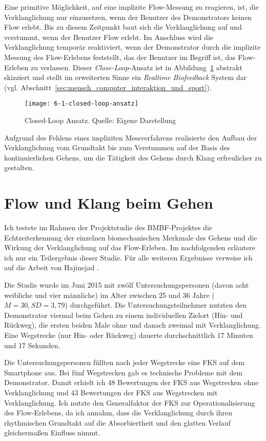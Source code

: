 Eine primitive Möglichkeit, auf eine implizite Flow-Messung zu reagieren, ist, die Verklanglichung nur einzusetzen, wenn der Benutzer des Demonstrators keinen Flow erlebt. Bis zu diesem Zeitpunkt baut sich die Verklanglichung auf und verstummt, wenn der Benutzer Flow erlebt. Im Anschluss wird die Verklanglichung temporär reaktiviert, wenn der Demonstrator durch die implizite Messung des Flow-Erlebens feststellt, das der Benutzer im Begriff ist, das Flow-Erleben zu verlassen. Dieser \emph{Close-Loop}-Ansatz ist in Abbildung~\ref{fig:6_1_closed_loop_ansatz} abstrakt skizziert \citep[vgl.][S.~474]{Calvo2015} und stellt im erweiterten Sinne ein \emph{Realtime Biofeedback} System dar (vgl. Abschnitt~\ref{sec:mensch_computer_interaktion_und_sport}). 

\begin{figure}[!htb]
	\centering
		\texttt{[image: 6-1-closed-loop-ansatz]}
	\caption[Closed-Loop Ansatz]{Closed-Loop Ansatz. Quelle: Eigene Darstellung}
	\label{fig:6_1_closed_loop_ansatz}
\end{figure}

Aufgrund des Fehlens eines impliziten Messverfahrens realisierte \citet{Hajinejad} den Aufbau der Verklanglichung vom Grundtakt bis zum Verstummen auf der Basis des kontinuierlichen Gehens, um die Tätigkeit des Gehens durch Klang erfreulicher zu gestalten.

\section{Flow und Klang beim Gehen}
Ich testete im Rahmen der Projektstudie des \acs{BMBF}-Projektes die Echtzeiterkennung der einzelnen biomechanischen Merkmale des Gehens und die Wirkung der Verklanglichung auf das Flow-Erleben. Im nachfolgenden erläutere ich nur ein Teilergebnis dieser Studie. Für alle weiteren Ergebnisse verweise ich auf die Arbeit von Hajinejad \citet{Hajinejad}. 

Die Studie wurde im Juni 2015 mit zwölf Untersuchungspersonen (davon acht weibliche und vier männliche) im Alter zwischen 25 und 36 Jahre ($M = 30, SD = 3,79$) durchgeführt. Die Untersuchungsteilnehmer nutzten den Demonstrator viermal beim Gehen zu einem individuellen Zielort (Hin- und Rückweg), die ersten beiden Male ohne und danach zweimal mit Verklanglichung. Eine Wegstrecke (nur Hin- oder Rückweg) dauerte durchschnittlich 17 Minuten und 17 Sekunden. 

Die Untersuchungspersonen füllten nach jeder Wegstrecke eine \ac{FKS} auf dem Smartphone aus. Bei fünf Wegstrecken gab es technische Probleme mit dem Demonstrator. Damit erhielt ich 48 Bewertungen der \ac{FKS} aus Wegstrecken ohne Verklanglichung und 43 Bewertungen der \ac{FKS} aus Wegstrecken mit Verklanglichung. Ich nutzte den Generalfaktor der \ac{FKS} zur Operationalisierung des Flow-Erlebens, da ich annahm, dass die Verklanglichung durch ihren rhythmischen Grundtakt auf die Absorbiertheit und den glatten Verlauf gleichermaßen Einfluss nimmt.

